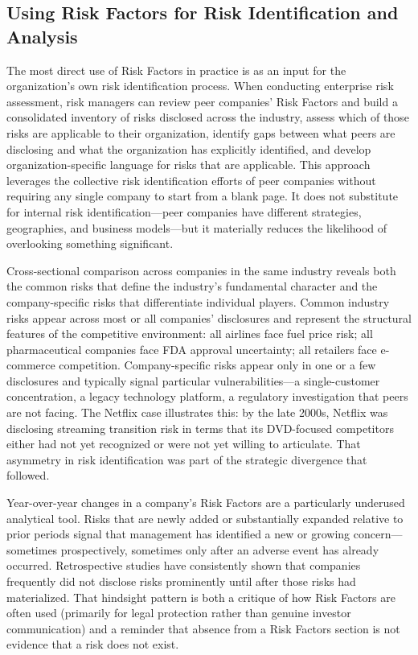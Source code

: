 \documentclass[11pt,openany]{book}
\begin{document}
\subsection{Using Risk Factors for Risk Identification and Analysis}
\label{subsec:using-risk-factors}

The most direct use of Risk Factors in practice is as an input for the organization's own risk identification process. When conducting enterprise risk assessment, risk managers can review peer companies' Risk Factors and build a consolidated inventory of risks disclosed across the industry, assess which of those risks are applicable to their organization, identify gaps between what peers are disclosing and what the organization has explicitly identified, and develop organization-specific language for risks that are applicable. This approach leverages the collective risk identification efforts of peer companies without requiring any single company to start from a blank page. It does not substitute for internal risk identification---peer companies have different strategies, geographies, and business models---but it materially reduces the likelihood of overlooking something significant.

Cross-sectional comparison across companies in the same industry reveals both the common risks that define the industry's fundamental character and the company-specific risks that differentiate individual players. Common industry risks appear across most or all companies' disclosures and represent the structural features of the competitive environment: all airlines face fuel price risk; all pharmaceutical companies face FDA approval uncertainty; all retailers face e-commerce competition. Company-specific risks appear only in one or a few disclosures and typically signal particular vulnerabilities---a single-customer concentration, a legacy technology platform, a regulatory investigation that peers are not facing. The Netflix case illustrates this: by the late 2000s, Netflix was disclosing streaming transition risk in terms that its DVD-focused competitors either had not yet recognized or were not yet willing to articulate. That asymmetry in risk identification was part of the strategic divergence that followed.

Year-over-year changes in a company's Risk Factors are a particularly underused analytical tool. Risks that are newly added or substantially expanded relative to prior periods signal that management has identified a new or growing concern---sometimes prospectively, sometimes only after an adverse event has already occurred. Retrospective studies have consistently shown that companies frequently did not disclose risks prominently until after those risks had materialized. That hindsight pattern is both a critique of how Risk Factors are often used (primarily for legal protection rather than genuine investor communication) and a reminder that absence from a Risk Factors section is not evidence that a risk does not exist.
\end{document}
